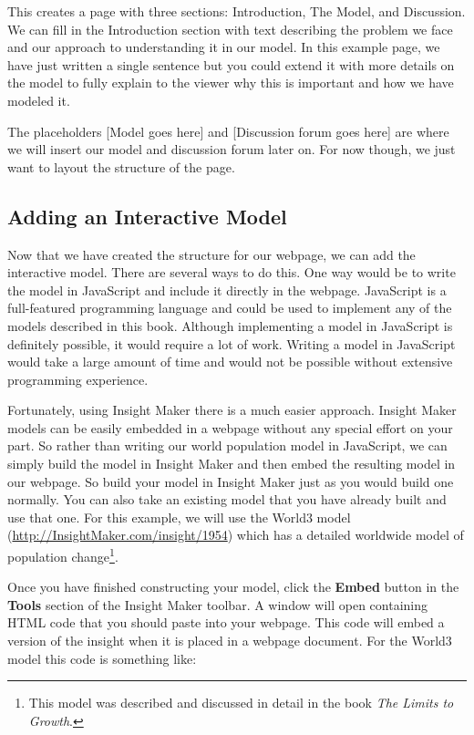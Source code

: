 \documentclass[]{memoir}
\renewcommand{\u}[1]{\textbf{#1}}
\begin{document}
This creates a page with three sections: Introduction, The Model, and
Discussion. We can fill in the Introduction section with text describing
the problem we face and our approach to understanding it in our model.
In this example page, we have just written a single sentence but you
could extend it with more details on the model to fully explain to the
viewer why this is important and how we have modeled it.

The placeholders {[}Model goes here{]} and {[}Discussion forum goes
here{]} are where we will insert our model and discussion forum later
on. For now though, we just want to layout the structure of the page.

\subsection{Adding an Interactive Model}

Now that we have created the structure for our webpage, we can add the
interactive model. There are several ways to do this. One way would be
to write the model in JavaScript and include it directly in the webpage.
JavaScript is a full-featured programming language and could be used to
implement any of the models described in this book. Although
implementing a model in JavaScript is definitely possible, it would
require a lot of work. Writing a model in JavaScript would take a large
amount of time and would not be possible without extensive programming
experience.

Fortunately, using Insight Maker there is a much easier approach.
Insight Maker models can be easily embedded in a webpage without any
special effort on your part. So rather than writing our world population
model in JavaScript, we can simply build the model in Insight Maker and
then embed the resulting model in our webpage. So build your model in
Insight Maker just as you would build one normally. You can also take an
existing model that you have already built and use that one. For this
example, we will use the World3 model
(\url{http://InsightMaker.com/insight/1954}) which has a detailed
worldwide model of population change\footnote{This model was described
  and discussed in detail in the book \emph{The Limits to Growth}.}.

Once you have finished constructing your model, click the \u{Embed}
button in the \u{Tools} section of the Insight Maker toolbar. A window
will open containing HTML code that you should paste into your webpage.
This code will embed a version of the insight when it is placed in a
webpage document. For the World3 model this code is something like:
\end{document}
